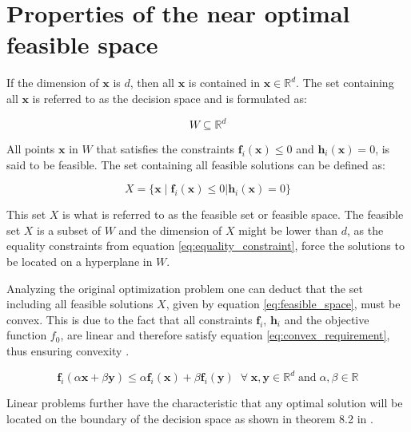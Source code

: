 

\section{Properties of the near optimal feasible space}\label{sec:properties_of_hull}

If the dimension of $\mathbf{x}$ is $d$, then all $\mathbf{x}$ is contained in  $\mathbf{x}\in \mathbb{R}^d $. The set containing all  $\mathbf{x}$ is referred to as the decision space and is formulated as: 

\begin{equation}
	W \subseteq \mathbb{R}^d 
\end{equation}

All points $\mathbf{x}$ in $W$ that satisfies the constraints $ \mathbf{f}_i(\mathbf{x}) \leq 0$ and $\mathbf{h}_i(\mathbf{x}) = 0$, is said to be feasible. The set containing all feasible solutions can be defined as: 

\begin{equation}\label{eq:feasible_space}
X = \{ \mathbf{x} \; | \; \mathbf{f}_i(\mathbf{x}) \leq 0 | \mathbf{h}_i(\mathbf{x}) = 0 \}
\end{equation}

This set $X$ is what is referred to as the feasible set or feasible space. The feasible set $X$ is a subset of $W$ and the dimension of $X$ might be lower than $d$, as the equality constraints from equation \ref{eq:equality_constraint}, force the solutions to be located on a hyperplane in $W$. 

Analyzing the original optimization problem one can deduct that the set including all feasible solutions $X$, given by equation \ref{eq:feasible_space}, must be convex. This is due to the fact that all constraints $\mathbf{f}_i$, $\mathbf{h}_i$ and the objective function $f_0$, are linear and therefore satisfy equation \vref{eq:convex_requirement}, thus ensuring convexity \cite{ConvexOpimization}. 

\begin{equation}\label{eq:convex_requirement}
\mathbf{f}_i(\alpha \mathbf{x} + \beta \mathbf{y}) \leq \alpha \mathbf{f}_i(\mathbf{x}) + \beta \mathbf{f}_i(\mathbf{y}) \; \; \forall \; \mathbf{x}, \mathbf{y} \in \mathbb{R}^d \; \text{and}  \; \alpha, \beta \in \mathbb{R}
\end{equation}

Linear problems further have the characteristic that any optimal solution will be located on the boundary of the decision space as shown in theorem 8.2 in \cite{OpimizationIntroduction}. 

